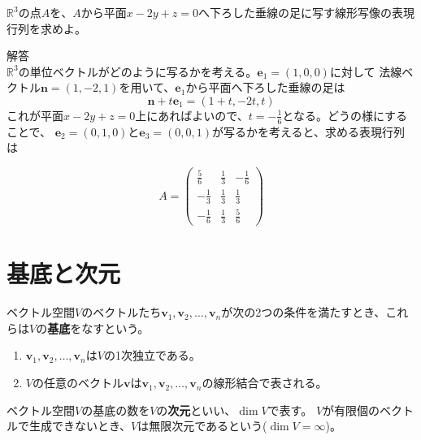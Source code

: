 \documentclass{jlreq}
\begin{document}
\begin{problem}
  $\mathbb{R}^3$の点$A$を、$A$から平面$x - 2y + z = 0$へ下ろした垂線の足に写す線形写像の表現行列を求めよ。
  \dotfill

  解答 \\
  $\mathbb{R}^3$の単位ベクトルがどのように写るかを考える。$\boldsymbol{e}_1 = (1, 0, 0)$に対して
  法線ベクトル$\boldsymbol{n} = (1, -2, 1)$を用いて、$\boldsymbol{e}_1$から平面へ下ろした垂線の足は
  \begin{equation*}
    \boldsymbol{n} + t \boldsymbol{e}_1 = (1 + t, -2t, t)
  \end{equation*}
  これが平面$x - 2y + z = 0$上にあればよいので、$t = -\frac{1}{6}$となる。どうの様にすることで、
  $\boldsymbol{e}_2 = (0, 1, 0)$と$\boldsymbol{e}_3 = (0, 0, 1)$が写るかを考えると、求める表現行列は

  \begin{equation*}
    A = \begin{pmatrix}
      \frac{5}{6} & \frac{1}{3} & -\frac{1}{6} \\
      -\frac{1}{3} & \frac{1}{3} & \frac{1}{3} \\
      -\frac{1}{6} & \frac{1}{3} & \frac{5}{6}
    \end{pmatrix}
  \end{equation*}
\end{problem}

\section{基底と次元}
\begin{definitionbox}[基底]
  ベクトル空間$V$のベクトルたち$\boldsymbol{v}_1, \boldsymbol{v}_2, \ldots, \boldsymbol{v}_n$が次の2つの条件を満たすとき、これらは$V$の\textbf{基底}をなすという。

  \begin{enumerate}
    \item $\boldsymbol{v}_1, \boldsymbol{v}_2, \ldots, \boldsymbol{v}_n$は$V$の1次独立である。
    \item $V$の任意のベクトル$\boldsymbol{v}$は$\boldsymbol{v}_1, \boldsymbol{v}_2, \ldots, \boldsymbol{v}_n$の線形結合で表される。
  \end{enumerate}
\end{definitionbox}

\begin{definitionbox}[次元]
  ベクトル空間$V$の基底の数を$V$の\textbf{次元}といい、$\dim V$で表す。
  $V$が有限個のベクトルで生成できないとき、$V$は無限次元であるという($\dim V = \infty$)。
\end{definitionbox}
\end{document}
